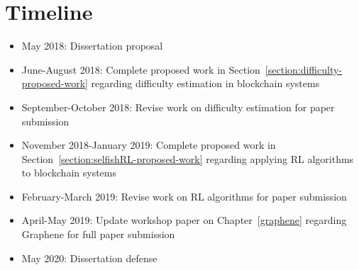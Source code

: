 \chapter{Timeline}
\label{timeline}

\begin{itemize}
\item May 2018: Dissertation proposal
\item June-August 2018: Complete proposed work in Section~\ref{section:difficulty-proposed-work} regarding difficulty estimation in blockchain systems
\item September-October 2018: Revise work on difficulty estimation for paper submission
\item November 2018-January 2019:  Complete proposed work in Section~\ref{section:selfishRL-proposed-work} regarding applying RL algorithms to blockchain systems
\item February-March 2019: Revise work on RL algorithms for paper submission
\item April-May 2019: Update workshop paper on Chapter~\ref{graphene} regarding Graphene for full paper submission
\item May 2020: Dissertation defense
\end{itemize}